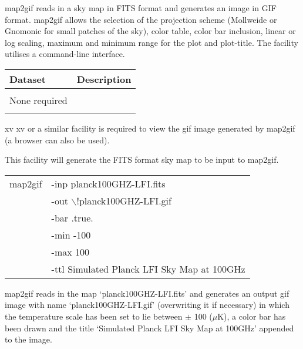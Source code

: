 \begin{codedescription}
{map2gif reads in a \healpix sky map in FITS format and generates an
image in GIF format. map2gif allows the selection of the projection
scheme (Mollweide or Gnomonic for small patches of the sky), color
table, color bar inclusion, linear or log scaling, maximum and 
minimum range for the plot and plot-title. The facility utilises
a command-line interface.}
\end{codedescription}

\begin{datasets}
{
\begin{tabular}{p{0.3\hsize} p{0.35\hsize}} \hline  
  \textbf{Dataset} & \textbf{Description} \\ \hline
                   &                      \\ %
  None required & \\ 
                   &                      \\ \hline %
\end{tabular}
} 
\end{datasets}

\begin{support}
  \begin{sulist}{} %
  \item[xv] xv or a similar facility is required to view the
            gif image generated by map2gif (a browser can also 
            be used).
  \item[\htmlref{synfast}{fac:synfast}] This \healpix facility will generate the FITS format 
            sky map to be input to map2gif.
  \end{sulist}
\end{support}


\begin{examples}{1}
{
\begin{tabular}{ll} %
map2gif & -inp planck100GHZ-LFI.fits \\
        & -out $\backslash$!planck100GHZ-LFI.gif \\
        & -bar .true. \\
        & -min -100 \\
        & -max 100 \\
        & -ttl Simulated Planck LFI Sky Map at 100GHz \\
\end{tabular}
}
{map2gif reads in the map `planck100GHZ-LFI.fits' and generates
an output gif image with name `planck100GHZ-LFI.gif' (overwriting it if
necessary) in which
the temperature scale has been set to lie between $\pm$ 100 ($\mu$K), 
a color bar has been drawn and the title `Simulated Planck
LFI Sky Map at 100GHz' appended to the image.
}
\end{examples}

